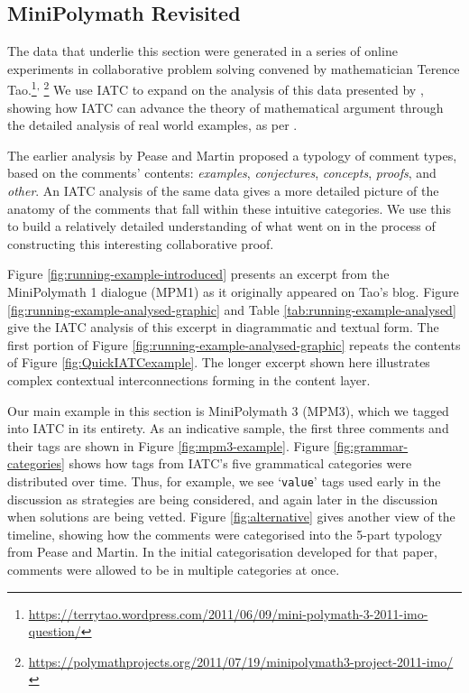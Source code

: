 \documentclass[smallextended,oneside]{svjour3}       %
\newcommand\nothing[1]{#1}
\let\thesis\nothing
\let\paragraph\nothing
\begin{document}

\subsection{MiniPolymath Revisited}\label{iatc-examples:minipolymath}

The data that underlie this section were generated in a series of online experiments in collaborative problem solving convened by mathematician Terence Tao.\footnote{\url{https://terrytao.wordpress.com/2011/06/09/mini-polymath-3-2011-imo-question/}}\textsuperscript{,}%
\footnote{\url{https://polymathprojects.org/2011/07/19/minipolymath3-project-2011-imo/}}
\thesis{We use IATC to expand on the analysis of
  this data presented by \citet{pease-and-martin},} showing how IATC can
advance the theory of mathematical argument through the
detailed analysis of real world examples, as per \citet{Carrascal2015}.

The earlier analysis by Pease and Martin proposed a typology of comment types, based on the comments' contents:
\emph{examples},
\emph{conjectures},
\emph{concepts},
\emph{proofs},
and \emph{other}.  
An IATC analysis of the same data gives a more detailed picture of the anatomy of the comments that fall within these intuitive categories.  We use this to build a relatively detailed understanding of what went on in the process of constructing this interesting collaborative proof.




\paragraph{Figure \ref{fig:running-example-introduced} presents an excerpt from the MiniPolymath 1 dialogue (MPM1) as it originally appeared on Tao's blog.}
Figure \ref{fig:running-example-analysed-graphic} and Table
\ref{tab:running-example-analysed} give the IATC analysis of this
excerpt in diagrammatic and textual form.  The first portion of Figure
\ref{fig:running-example-analysed-graphic} repeats the contents of Figure
\ref{fig:QuickIATCexample}.  The longer excerpt shown here illustrates
complex contextual interconnections forming in the content
layer.

\paragraph{Our main example in this section is MiniPolymath 3 (MPM3),
which we tagged into IATC in its entirety.}
As an indicative sample, the first three comments and their tags are shown in Figure
\ref{fig:mpm3-example}.
Figure \ref{fig:grammar-categories} shows how tags from IATC's five grammatical
categories were distributed over time.  Thus, for example, we see
`\texttt{value}' tags used early in the discussion as strategies are
being considered, and again later in the discussion when solutions are
being vetted.
Figure \ref{fig:alternative} gives another view of the timeline,
showing how the comments were categorised into the 5-part typology
from Pease and Martin.  In the initial
categorisation developed for that paper, comments were allowed to be
in multiple categories at once.
\end{document}
